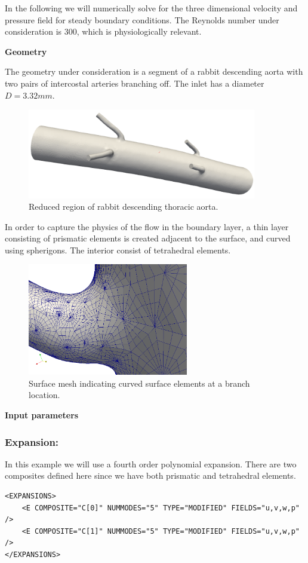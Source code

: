 In the following we will numerically solve for the three dimensional velocity
and pressure field for steady boundary conditions. The Reynolds number under
consideration is 300, which is physiologically relevant.

\textbf{Geometry}

The geometry under consideration is a segment of a rabbit descending aorta with two pairs of intercostal arteries branching off. The inlet has a diameter $D=3.32mm$.

\begin{figure}
\begin{center}
\includegraphics[width=10cm]{img/IntercostalGeometry.png}
\caption{Reduced region of rabbit descending thoracic aorta.}
\end{center}
\end{figure}

In order to capture the physics of the flow in the boundary layer, a thin layer consisting of prismatic elements is created adjacent to the surface, and curved using spherigons. The interior consist of tetrahedral elements.

\begin{figure}
\begin{center}
\includegraphics[width=7cm]{img/spherigons.png}
\caption{Surface mesh indicating curved surface elements at a branch location.}
\end{center}
\end{figure}


\textbf{Input parameters}

\subsubsection{Expansion:~} In this example we will use a fourth order polynomial expansion. There are two composites defined here since we have both prismatic and tetrahedral elements.
\begin{lstlisting}[style=XMLStyle]
<EXPANSIONS>
    <E COMPOSITE="C[0]" NUMMODES="5" TYPE="MODIFIED" FIELDS="u,v,w,p" />
    <E COMPOSITE="C[1]" NUMMODES="5" TYPE="MODIFIED" FIELDS="u,v,w,p" />
</EXPANSIONS>
\end{lstlisting}

